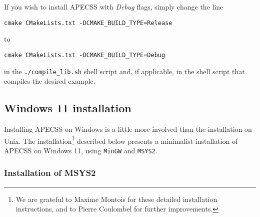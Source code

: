 If you wish to install APECSS with \textit{Debug} flags, simply change the line
\begin{lstlisting}[style=CStyle,numbers=none]
  cmake CMakeLists.txt -DCMAKE_BUILD_TYPE=Release
\end{lstlisting}\vspace{-0.75em}
to
\begin{lstlisting}[style=CStyle,numbers=none]
  cmake CMakeLists.txt -DCMAKE_BUILD_TYPE=Debug
\end{lstlisting}\vspace{-0.75em}
in the {\tt ./compile\_lib.sh} shell script and, if applicable, in the shell script that compiles the desired example.

\subsection{Windows 11 installation}

Installing APECSS on Windows is a little more involved than the installation on Unix. The installation\footnote{We are grateful to Maxime Montois for these detailed installation instructions, and to Pierre Coulombel for further improvements.} described below presents a minimalist installation of APECSS on Windows 11, using {\tt MinGW} and {\tt MSYS2}. 

\subsubsection*{Installation of MSYS2}

